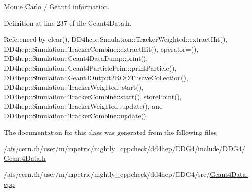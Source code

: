 Monte Carlo / Geant4 information. 

Definition at line 237 of file Geant4Data.h.

Referenced by clear(), DD4hep::Simulation::TrackerWeighted::extractHit(), DD4hep::Simulation::TrackerCombine::extractHit(), operator=(), DD4hep::Simulation::Geant4DataDump::print(), DD4hep::Simulation::Geant4ParticlePrint::printParticle(), DD4hep::Simulation::Geant4Output2ROOT::saveCollection(), DD4hep::Simulation::TrackerWeighted::start(), DD4hep::Simulation::TrackerCombine::start(), storePoint(), DD4hep::Simulation::TrackerWeighted::update(), and DD4hep::Simulation::TrackerCombine::update().

The documentation for this class was generated from the following files:\begin{DoxyCompactItemize}
\item 
/afs/cern.ch/user/m/mpetric/nightly\_\-cppcheck/dd4hep/DDG4/include/DDG4/\hyperlink{_geant4_data_8h}{Geant4Data.h}\item 
/afs/cern.ch/user/m/mpetric/nightly\_\-cppcheck/dd4hep/DDG4/src/\hyperlink{_geant4_data_8cpp}{Geant4Data.cpp}\end{DoxyCompactItemize}
